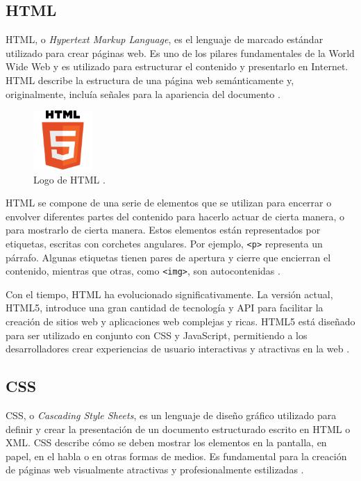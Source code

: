 \subsection{HTML}
HTML, o \textit{Hypertext Markup Language}, es el lenguaje de marcado estándar
utilizado para crear páginas web. Es uno de los pilares fundamentales de la
World Wide Web y es utilizado para estructurar el contenido y presentarlo en
Internet. HTML describe la estructura de una página web semánticamente y,
originalmente, incluía señales para la apariencia del documento \cite{whatwg_html_standard}.

\begin{figure}[!htbp]
  \centering
  \includegraphics[width=0.2\textwidth]{imagenes/02-marco-teorico/html-logo.png}
  \caption[Logo de HTML]{Logo de HTML \cite{whatwg_html_standard}.}
  \label{fig:html-logo}
\end{figure}

HTML se compone de una serie de elementos que se utilizan para encerrar o envolver
diferentes partes del contenido para hacerlo actuar de cierta manera, o para
mostrarlo de cierta manera. Estos elementos están representados por etiquetas,
escritas con corchetes angulares. Por ejemplo, \texttt{<p>} representa un párrafo.
Algunas etiquetas tienen pares de apertura y cierre que encierran el contenido,
mientras que otras, como \texttt{<img>}, son autocontenidas \cite{whatwg_html_standard}.

Con el tiempo, HTML ha evolucionado significativamente. La versión actual, HTML5,
introduce una gran cantidad de tecnología y API para facilitar la creación de
sitios web y aplicaciones web complejas y ricas. HTML5 está diseñado para ser
utilizado en conjunto con CSS y JavaScript, permitiendo a los desarrolladores
crear experiencias de usuario interactivas y atractivas en la web \cite{whatwg_html_standard}.

\subsection{CSS}
CSS, o \textit{Cascading Style Sheets}, es un lenguaje de diseño gráfico utilizado
para definir y crear la presentación de un documento estructurado escrito en
HTML o XML. CSS describe cómo se deben mostrar los elementos en la pantalla,
en papel, en el habla o en otras formas de medios. Es fundamental para la creación
de páginas web visualmente atractivas y profesionalmente estilizadas \cite{w3c_css_home}.

